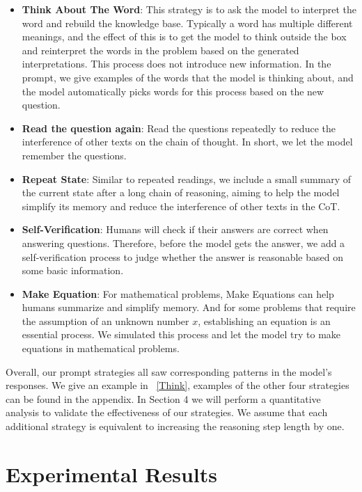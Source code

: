 \documentclass[11pt]{article}
\begin{document}
\begin{itemize}[leftmargin=*]\setlength\itemsep{-0.3em}
\item
\textbf{Think About The Word}: This strategy is to ask the model to interpret the word and rebuild the knowledge base. Typically a word has multiple different meanings, and the effect of this is to get the model to think outside the box and reinterpret the words in the problem based on the generated interpretations. This process does not introduce new information. In the prompt, we give examples of the words that the model is thinking about, and the model automatically picks words for this process based on the new question.

\item
\textbf{Read the question again}: Read the questions repeatedly to reduce the interference of other texts on the chain of thought. In short, we let the model remember the questions.

\item
\textbf{Repeat State}: Similar to repeated readings, we include a small summary of the current state after a long chain of reasoning, aiming to help the model simplify its memory and reduce the interference of other texts in the CoT.

\item
\textbf{Self-Verification}: Humans will check if their answers are correct when answering questions. Therefore, before the model gets the answer, we add a self-verification process to judge whether the answer is reasonable based on some basic information.

\item
\textbf{Make Equation}: For mathematical problems, Make Equations can help humans summarize and simplify memory. And for some problems that require the assumption of an unknown number $x$, establishing an equation is an essential process. We simulated this process and let the model try to make equations in mathematical problems.
\end{itemize}

Overall, our prompt strategies all saw corresponding patterns in the model's responses. We give an example in ~\autoref{Think}, examples of the other four strategies can be found in the appendix. In Section 4 we will perform a quantitative analysis to validate the effectiveness of our strategies. We assume that each additional strategy is equivalent to increasing the reasoning step length by one.
\section{Experimental Results}
\end{document}
